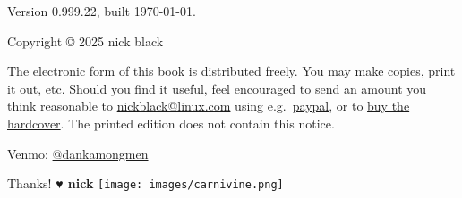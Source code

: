 \clearpage
Version 0.999.22, built \today.

Copyright © 2025 nick black

\bigskip
The electronic form of this book is distributed freely.
You may make copies, print it out, etc.
Should you find it useful, feel encouraged to send an amount you think reasonable to
  \href{mailto:nickblack@linux.com}{nickblack@linux.com} using
  e.g.\ \href{https://paypal.me/dankamongmen}{paypal},
  or to \href{https://goldandappelpub.com/pgo-quantitative.html}{buy the hardcover}.
The printed edition does not contain this notice.

\bigskip
Venmo: \href{https://venmo.com/?txn=pay&audience=friends&recipients=dankamongmen&amount=10&note=pgoquant}{@dankamongmen}

\bigskip
Thanks! {\textbf{♥ nick}}
\vfill\texttt{[image: images/carnivine.png]}\vfill
